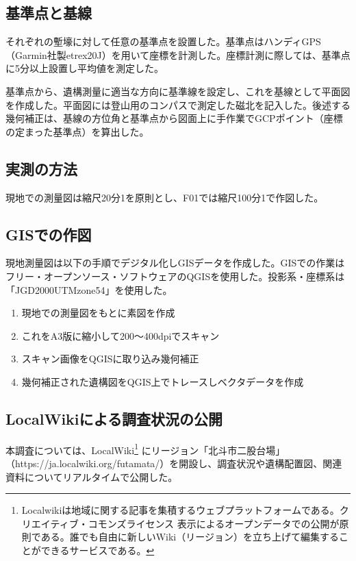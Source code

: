 \documentclass[11pt,report]{jsarticle}
\begin{document}
\subsection{基準点と基線}
それぞれの塹壕に対して任意の基準点を設置した。基準点はハンディGPS（Garmin社製etrex20J）を用いて座標を計測した。座標計測に際しては、基準点に5分以上設置し平均値を測定した。

基準点から、遺構測量に適当な方向に基準線を設定し、これを基線として平面図を作成した。平面図には登山用のコンパスで測定した磁北を記入した。後述する幾何補正は、基線の方位角と基準点から図面上に手作業でGCPポイント（座標の定まった基準点）を算出した。

\subsection{実測の方法}
現地での測量図は縮尺20分1を原則とし、F01では縮尺100分1で作図した。

\subsection{GISでの作図}
現地測量図は以下の手順でデジタル化しGISデータを作成した。GISでの作業はフリー・オープンソース・ソフトウェアのQGISを使用した。投影系・座標系は「JGD2000UTMzone54」を使用した。

\begin{enumerate}
\item 現地での測量図をもとに素図を作成
\item これをA3版に縮小して200〜400dpiでスキャン
\item スキャン画像をQGISに取り込み幾何補正
\item 幾何補正された遺構図をQGIS上でトレースしベクタデータを作成
\end{enumerate}

\subsection{LocalWikiによる調査状況の公開}
本調査については、LocalWiki\footnote{
Localwikiは地域に関する記事を集積するウェブプラットフォームである。クリエイティブ・コモンズライセンス 表示によるオープンデータでの公開が原則である。誰でも自由に新しいWiki（リージョン）を立ち上げて編集することができるサービスである。
}
にリージョン「北斗市二股台場」（https://ja.localwiki.org/futamata/）を開設し、調査状況や遺構配置図、関連資料についてリアルタイムで公開した。

\end{document}
